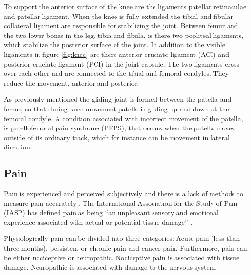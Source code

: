 \noindent
To support the anterior surface of the knee are the ligaments patellar retinaculae and patellar ligament. When the knee is fully extended the tibial and fibular collateral ligament are responsible for stabilizing the joint. Between femur and the two lower bones in the leg, tibia and fibula, is there two popliteal ligaments, which stabilize the posterior surface of the joint. In addition to the visible ligaments in figure \ref{fig:knee} are there anterior cruciate ligament (ACI) and posterior cruciate ligament (PCI) in the joint capsule. The two ligaments cross over each other and are connected to the tibial and femoral condyles. They reduce the movement, anterior and posterior.\citep{Martini2012}

As previously mentioned the gliding joint is formed between the patella and femur, so that during knee movement patella is gliding up and down at the femoral condyle. A condition associated with incorrect movement of the patella, is patellofemoral pain syndrome (PFPS), that occurs when the patella moves outside of its ordinary track, which for instance can be movement in lateral direction.\citep{Martini2012}



\subsection{Pain}
Pain is experienced and perceived subjectively and there is a lack of methods to measure pain accurately \citep{IASP2012, Younger2009}. 
The International Association for the Study of Pain (IASP) has defined pain as being “an unpleasant sensory and emotional experience associated with actual or potential tissue damage” \citep{IASP2012}.

Physiologically pain can be divided into three categories: Acute pain (less than three months), persistent or chronic pain and cancer pain. Furthermore, pain can be either nociceptive or neuropathic. Nociceptive pain is associated with tissue damage. Neuropathic is associated with damage to the nervous system.\citep{Briggs2010} 

